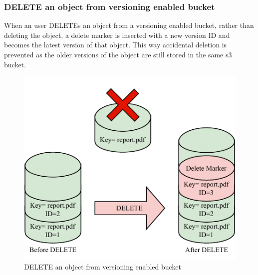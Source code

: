 \documentclass{home_assignment}
\begin{document}
    \subsubsection{DELETE an object from versioning enabled bucket}
    When an user DELETEs an object from a versioning enabled bucket, rather than deleting the object, a delete marker is inserted with a new version ID and becomes the latest version of that object. This way accidental deletion is prevented as the older versions of the object are still stored in the same \acrshort{s3} bucket.
    \begin{figure}[H]
        \centering
        \includegraphics[scale=1.3]{../Figures/versioning_delete}
        \caption{DELETE an object from versioning enabled bucket}
        \label{fig:delete}
    \end{figure}
  
\end{document}
